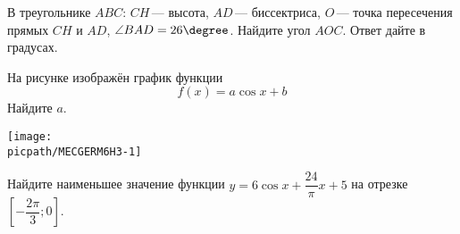 \begin{homework}[number=3]
\begin{listofex}
		
		\item В треугольнике \(ABC\): \(CH\) --- высота, \(AD\) --- биссектриса, \(O\) --- точка пересечения прямых \(CH\) и \(AD\), \(\angle BAD = 26 \degree\). Найдите угол \(AOC\). Ответ дайте в градусах.
		\item
		\begin{minipage}[t]{\bodywidth}
			На рисунке изображён график функции \[ f(x)=a \cos{x}+b \] Найдите \(a\).
		\end{minipage}
		\hspace{0.02\linewidth}
		\begin{minipage}[t]{\picwidth}
			\texttt{[image: \\picpath/MECGERM6H3-1]}
		\end{minipage}
		\item Найдите наименьшее значение функции \( y=6 \cos x + \dfrac{ 24 }{ \pi }x+5 \) на отрезке \(\left[ -\dfrac{ 2\pi }{ 3 };0 \right] \).
		

\end{listofex}
\end{homework}
